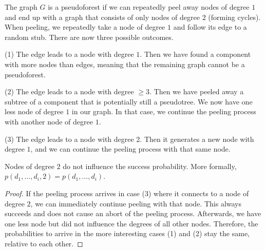 \documentclass[a4paper,USenglish,cleveref]{lipics-v2021}
\begin{document}
The graph $G$ is a pseudoforest if we can repeatedly peel away nodes of degree $1$ and end up with a graph that consists of only nodes of degree $2$ (forming cycles).
When peeling, we repeatedly take a node of degree $1$ and follow its edge to a random stub.
There are now three possible outcomes.

(1) The edge leads to a node with degree $1$.
Then we have found a component with more nodes than edges, meaning that the remaining graph cannot be a pseudoforest.

(2) The edge leads to a node with degree $\geq 3$.
Then we have peeled away a subtree of a component that is potentially still a pseudotree.
We now have one less node of degree $1$ in our graph.
In that case, we continue the peeling process with another node of degree $1$.

(3) The edge leads to a node with degree $2$.
Then it generates a new node with degree $1$, and we can continue the peeling process with that same node.

\begin{lemma}
  Nodes of degree $2$ do not influence the success probability.
  More formally, $p(d_1, \ldots, d_{i},2) = p(d_1,\ldots,d_{i})$.
  \label{lem:peelingDegree2}
\end{lemma}
\begin{proof}
  If the peeling process arrives in case (3) where it connects to a node of degree $2$, we can immediately continue peeling with that node.
  This always succeeds and does not cause an abort of the peeling process.
  Afterwards, we have one less node but did not influence the degrees of all other nodes.
  Therefore, the probabilities to arrive in the more interesting cases (1) and (2) stay the same, relative to each other.
\end{proof}
\end{document}
